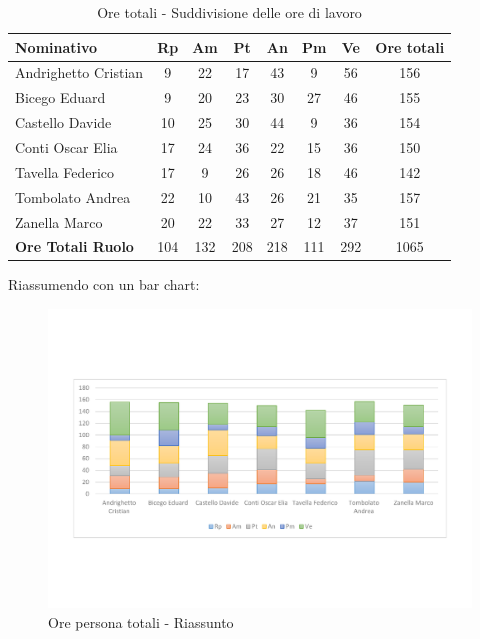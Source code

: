 \documentclass[../PianoProgetto.tex]{subfiles}
\begin{document}
	\begin{table}[h]
		\begin{tabularx}{\textwidth}{l  * {6}{C}  c}
			\toprule
			\textbf{Nominativo} & \textbf{Rp} & \textbf{Am} & \textbf{Pt} 
						& \textbf{An} & \textbf{Pm} & \textbf{Ve} & \textbf{Ore totali} \\
			\midrule
			Andrighetto Cristian & 9 & 22 & 17 & 43 & 9 & 56 &	156 \\
			Bicego Eduard & 9 & 20 & 23 & 30 & 27 & 46 & 155 \\
			Castello Davide & 10 & 25 & 30 & 44 & 9 & 36 & 154 \\
			Conti Oscar Elia & 17 & 24 & 36 & 22 & 15 & 36 & 150 \\
			Tavella Federico &	17 & 9 & 26 & 26 & 18 & 46 & 142 \\
			Tombolato Andrea & 22 & 10 & 43 & 26 & 21 & 35 & 157 \\
			Zanella Marco & 20 & 22 & 33 & 27 & 12 & 37 & 151 \\
			\midrule			
			\textbf{Ore Totali Ruolo} & 104 & 132 & 208 & 218 & 111 & 292 & 1065 \\
			\bottomrule
		\end{tabularx}
		\caption{Ore totali - Suddivisione delle ore di lavoro}
		\label{tab:totale_ore}
	\end{table}
	
\newpage
\vfill
	Riassumendo con un bar chart:
	
	\begin{figure}[!h]
		\centering
		\includegraphics[width=\textwidth , trim=2cm 5cm 2cm 5cm]{grafici/Riepilogo/Totali/ore-persona}
			\caption{Ore persona totali - Riassunto}
		\label{fig:BarChart-totale_ore}
	\end{figure}
	
\end{document}
